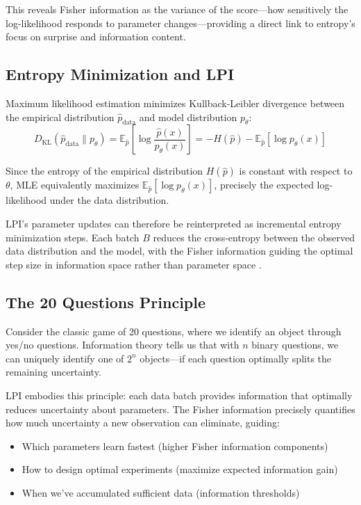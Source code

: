 \documentclass[11pt]{article}
\begin{document}
This reveals Fisher information as the variance of the score---how sensitively the log-likelihood responds to parameter changes---providing a direct link to entropy's focus on surprise and information content.

\subsection{Entropy Minimization and LPI}
Maximum likelihood estimation minimizes Kullback-Leibler divergence between the empirical distribution $\hat{p}_{\text{data}}$ and model distribution $p_\theta$:
\begin{equation}
D_{\text{KL}}(\hat{p}_{\text{data}} \| p_\theta) = \mathbb{E}_{\hat{p}}\left[\log\frac{\hat{p}(x)}{p_\theta(x)}\right] = -H(\hat{p}) - \mathbb{E}_{\hat{p}}[\log p_\theta(x)]
\end{equation}

Since the entropy of the empirical distribution $H(\hat{p})$ is constant with respect to $\theta$, MLE equivalently maximizes $\mathbb{E}_{\hat{p}}[\log p_\theta(x)]$, precisely the expected log-likelihood under the data distribution.

LPI's parameter updates can therefore be reinterpreted as incremental entropy minimization steps. Each batch $B$ reduces the cross-entropy between the observed data distribution and the model, with the Fisher information guiding the optimal step size in information space rather than parameter space \cite{amari2016information}.

\subsection{The 20 Questions Principle}
Consider the classic game of 20 questions, where we identify an object through yes/no questions. Information theory tells us that with $n$ binary questions, we can uniquely identify one of $2^n$ objects---if each question optimally splits the remaining uncertainty.

LPI embodies this principle: each data batch provides information that optimally reduces uncertainty about parameters. The Fisher information precisely quantifies how much uncertainty a new observation can eliminate, guiding:

\begin{itemize}
\item Which parameters learn fastest (higher Fisher information components)
\item How to design optimal experiments (maximize expected information gain)
\item When we've accumulated sufficient data (information thresholds)
\end{itemize}
\end{document}
